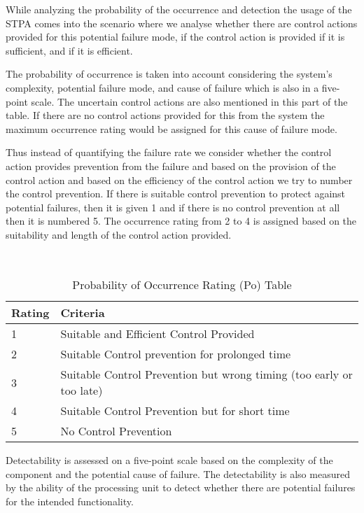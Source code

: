 {While analyzing the probability of the occurrence and detection the usage of the STPA comes into the scenario where we analyse whether there are control actions provided for this potential failure mode, if the control action is provided if it is sufficient, and if it is efficient. 
    
The probability of occurrence is taken into account considering the system's complexity, potential failure mode, and cause of failure which is also in a five-point scale. The uncertain control actions are also mentioned in this part of the table. If there are no control actions provided for this from the system the maximum occurrence rating would be assigned for this cause of failure mode.

Thus instead of quantifying the failure rate we consider whether the control action provides prevention from the failure and based on the provision of the control action and based on the efficiency of the control action we try to number the control prevention. If there is suitable control prevention to protect against potential failures, then it is given 1 and if there is no control prevention at all then it is numbered 5. The occurrence rating  from 2 to 4 is assigned based on the suitability and length of the control action provided.


\begin{table}[ht]
\centering\
\begin{tabularx}{\linewidth}{|X||X|}
\hline
 Rating & Criteria \\
\hline
1 & Suitable and Efficient Control Provided \\
\hline
2 &  Suitable Control prevention for prolonged time   \\
\hline
3  & Suitable Control Prevention but wrong timing (too early or too late) \\
 \hline
4  &  Suitable Control Prevention but  for short time \\
\hline
5  & No Control Prevention \\
\hline

 \end{tabularx}
  \caption{Probability of Occurrence Rating (Po) Table}
\end{table}

Detectability is assessed on a five-point scale based on the complexity of the component and the potential cause of failure. The detectability is also measured by the ability of the processing unit to detect whether there are potential failures for the intended functionality.

}

